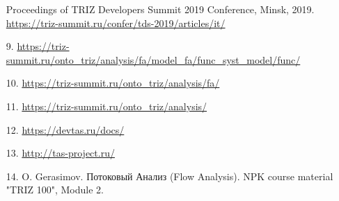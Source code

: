 \documentclass[11pt,a4paper]{article}
\begin{document}
\begin{itemize}[leftmargin=18pt]
  Proceedings of TRIZ Developers Summit 2019 Conference, Minsk, 2019.\\
  \url{https://triz-summit.ru/confer/tds-2019/articles/it/}
\item[9.] {\small 
  \url{https://triz-summit.ru/onto_triz/analysis/fa/model_fa/func_syst_model/func/} }
\item[10.] \url{https://triz-summit.ru/onto_triz/analysis/fa/}
\item[11.] \url{https://triz-summit.ru/onto_triz/analysis/}
\item[12.] \url{https://devtas.ru/docs/}
\item[13.] \url{http://tas-project.ru/}
\item[14.] O. Gerasimov. \foreignlanguage{russian}{Потоковый Анализ} (Flow
  Analysis). NPK course material "TRIZ 100", Module 2. 
\end{itemize}
\end{document}
